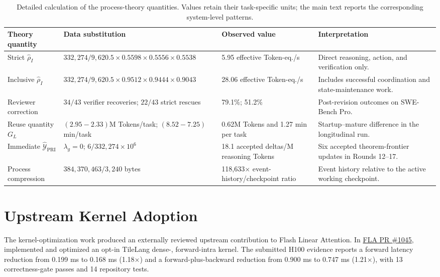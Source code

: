 \begin{table}[H]
\centering
\scriptsize
\renewcommand{\arraystretch}{1.13}
\begin{tabularx}{\linewidth}{@{}p{2.25cm}p{4.3cm}p{2.15cm}X@{}}
\toprule
\rowcolor{papersand}
\textbf{Theory quantity} & \textbf{Data substitution} & \textbf{Observed value} & \textbf{Interpretation} \\
\midrule
Strict $\widehat{\rho}_I$ & $332{,}274/9{,}620.5\times0.5598\times0.5556\times0.5538$ & 5.95 effective Token-eq./s & Direct reasoning, action, and verification only. \\
Inclusive $\widehat{\rho}_I$ & $332{,}274/9{,}620.5\times0.9512\times0.9444\times0.9043$ & 28.06 effective Token-eq./s & Includes successful coordination and state-maintenance work. \\
Reviewer correction & $34/43$ verifier recoveries; $22/43$ strict rescues & 79.1\%; 51.2\% & Post-revision outcomes on SWE-Bench Pro. \\
Reuse quantity $G_L$ & $(2.95-2.33)$M Tokens/task; $(8.52-7.25)$ min/task & 0.62M Tokens and 1.27 min per task & Startup--mature difference in the longitudinal run. \\
Immediate $\widehat{\mathcal{Y}}_{\mathrm{PRI}}$ & $\lambda_g=0$; $6/332{,}274\times10^6$ & 18.1 accepted deltas/M reasoning Tokens & Six accepted theorem-frontier updates in Rounds 12--17. \\
Process compression & $384{,}370{,}463/3{,}240$ bytes & 118,633$\times$ event-history/checkpoint ratio & Event history relative to the active working checkpoint. \\
\bottomrule
\end{tabularx}
\caption{Detailed calculation of the process-theory quantities. Values retain
their task-specific units; the main text reports the corresponding system-level
patterns.}
\label{tab:formula-instantiation}
\end{table}

\section{Upstream Kernel Adoption}
\label{app:upstream-kernel}

The kernel-optimization work produced an externally reviewed upstream
contribution to Flash Linear Attention. In
\href{https://github.com/fla-org/flash-linear-attention/pull/1045}
{FLA PR \#1045}, \systemname implemented and optimized an opt-in TileLang
 dense-,  forward-intra kernel. The submitted
H100 evidence reports a forward latency reduction from 0.199 ms to 0.168 ms
(1.18$\times$) and a forward-plus-backward reduction from 0.900 ms to 0.747 ms
(1.21$\times$), with 13 correctness-gate passes and 14 repository tests.


